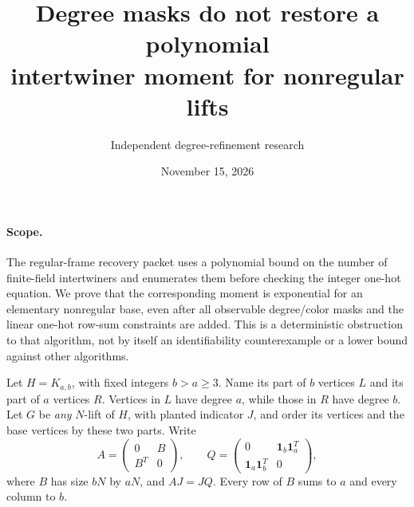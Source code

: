 \documentclass[11pt]{article}
\title{Degree masks do not restore a polynomial\protect\\intertwiner moment for nonregular lifts}
\author{Independent degree-refinement research}
\date{November 15, 2026}
\newcommand{\one}{\mathbf1}
\begin{document}
\maketitle

\paragraph{Scope.}
The regular-frame recovery packet uses a polynomial bound on the number
of finite-field intertwiners and enumerates them before checking the
integer one-hot equation. We prove that the corresponding moment is
exponential for an elementary nonregular base, even after all observable
degree/color masks and the linear one-hot row-sum constraints are added.
This is a deterministic obstruction to that algorithm, not by itself an
identifiability counterexample or a lower bound against other algorithms.

Let $H=K_{a,b}$, with fixed integers $b>a\ge3$. Name its part of $b$
vertices $L$ and its part of $a$ vertices $R$. Vertices in $L$ have degree
$a$, while those in $R$ have degree $b$. Let $G$ be \emph{any} $N$-lift
of $H$, with planted indicator $J$, and order its vertices and the base
vertices by these two parts. Write
\[
 A=\begin{pmatrix}0&B\\B^T&0\end{pmatrix},\qquad
 Q=\begin{pmatrix}0&\one_b\one_a^T\\
                       \one_a\one_b^T&0\end{pmatrix},
\]
where $B$ has size $bN$ by $aN$, and $AJ=JQ$.
Every row of $B$ sums to $a$ and every column to $b$.
\end{document}
